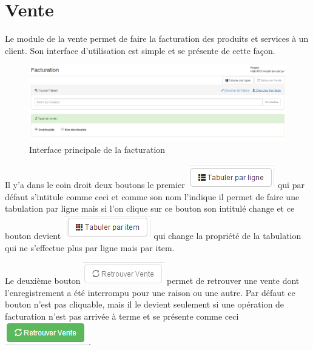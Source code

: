 \documentclass[12pt,a4paper]{report}
\begin{document}
\section{Vente}
Le module de la vente permet de faire la facturation des produits et services à un client. Son interface d'utilisation est simple et se présente de cette façon.

\begin{figure}[h]
\begin{center}
\includegraphics[width=14cm]{pic/InterfacePrinciFact.png}
\end{center}
\caption{Interface principale de la facturation}
\label{Interface principale de la facturation}
\end{figure}

Il y'a dans le coin droit deux boutons le premier \includegraphics[scale=0.7]{pic/tabulerParLigne.png}  qui par défaut s'intitule comme ceci et comme son nom l'indique il permet de faire une tabulation par ligne mais si l'on clique sur ce bouton son intitulé change et ce bouton devient 
\includegraphics[scale=0.7]{pic/tabulerParItem.png}  qui change la propriété de la tabulation qui ne s'effectue plus par ligne mais par item. 

Le deuxième bouton \includegraphics[scale=0.7]{pic/RetrouverVente.png}  permet de retrouver une vente dont l'enregistrement a été interrompu pour une raison ou une autre. Par défaut ce bouton n'est pas cliquable, mais il le devient seulement si une opération de facturation n'est pas arrivée à terme et se présente comme ceci \includegraphics[scale=0.7]{pic/RetrouverVenteGreen.png}.
\end{document}
